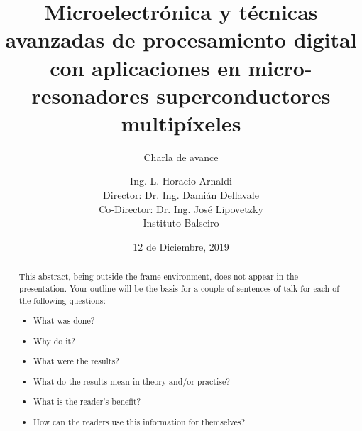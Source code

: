 \documentclass[ignorenonframetext,12pt]{beamer}
\title{Microelectrónica y técnicas avanzadas de procesamiento digital con
aplicaciones en micro-resonadores superconductores multipíxeles}
\subtitle{\alert{Charla de avance}}
\author{Ing. L. Horacio Arnaldi\\
\vspace{0.4cm}
Director: Dr. Ing. Damián Dellavale\\
Co-Director: Dr. Ing. José Lipovetzky\\
\vspace{0.6cm}
Instituto Balseiro}
\date{12 de Diciembre, 2019}
\begin{document}
\begin{frame}
				\maketitle
\end{frame}

\begin{abstract}
				This abstract, being outside the frame environment, does not appear in
				the presentation.  Your outline will be the basis for a couple of
				sentences of talk for each of the following questions:
				\begin{itemize}
								\item What was done?
								\item Why do it?
								\item What were the results?
								\item What do the results mean in theory and/or practise?
								\item What is the reader's benefit?
								\item How can the readers use this information for themselves? 
				\end{itemize}
\end{abstract}


\end{document}
